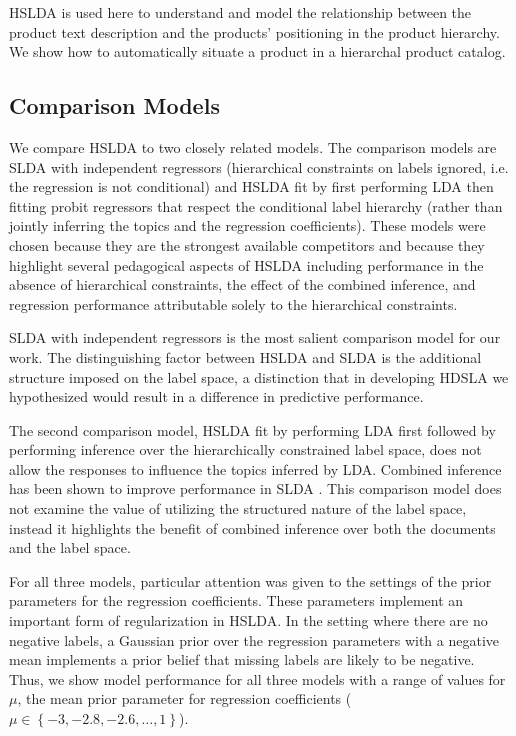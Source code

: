 HSLDA is used here to understand and model the relationship between the product text description and the products' positioning in the product hierarchy.  We show how to automatically situate a product in a hierarchal product catalog.  


\subsection{Comparison Models}

We compare HSLDA to two closely related models. The comparison models are SLDA with independent
regressors (hierarchical constraints on labels ignored,  i.e. the regression is not conditional) and HSLDA fit by first
performing LDA then fitting probit regressors that respect the conditional label hierarchy (rather than jointly inferring the topics and the regression coefficients). These models were
chosen because they are the strongest available competitors and because they  highlight several pedagogical aspects of HSLDA including performance in the
absence  of hierarchical constraints, the effect of the combined inference, and
regression performance attributable solely to the hierarchical constraints.

SLDA with independent regressors is the most salient comparison model
for our work. The distinguishing factor between HSLDA and SLDA is the
additional structure imposed on the label space, a distinction that in developing HDSLA we
hypothesized would result in a difference in predictive performance. 

 The second comparison model, HSLDA fit by performing LDA first
followed by performing inference over the hierarchically constrained label
space, does not allow
the responses to influence the topics inferred by LDA.
Combined inference has been shown to improve performance in SLDA
\cite{BleiMcAuliffe2008}. This comparison model does not examine the value of utilizing the structured nature 
of the label space, instead it highlights the benefit of combined inference over both the
documents and the label space. 


For all three models, particular attention was given to the settings of the 
prior parameters for the regression coefficients. These parameters implement an
important form of regularization in HSLDA. In the setting where there are no
negative labels, a Gaussian prior over the regression parameters with a
negative mean implements a prior belief that missing labels are likely to be
negative. Thus, we show model performance for all three models with a
range of values for $\mu$, the mean prior parameter for regression coefficients 
($\mu\in\left\{ -3,-2.8,-2.6,\ldots,1\right\}$).

